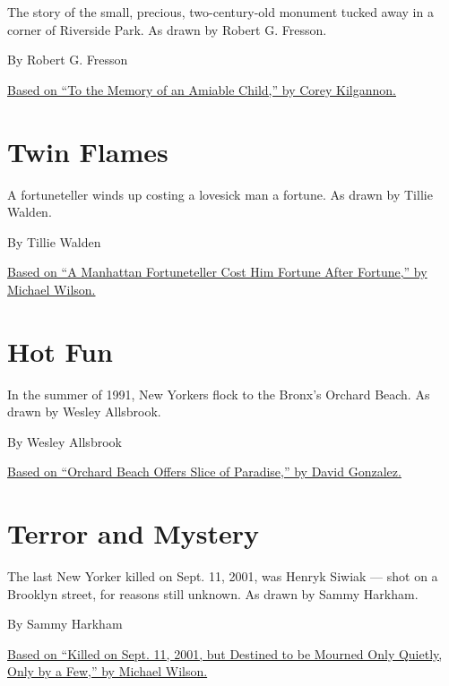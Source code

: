 The story of the small, precious, two-century-old monument tucked away
in a corner of Riverside Park. As drawn by Robert G. Fresson.

By Robert G. Fresson

\href{https://cityroom.blogs.nytimes3xbfgragh.onion/2008/08/12/to-the-memory-of-an-amiable-child/comment-page-1/}{Based
on ``To the Memory of an Amiable Child,'' by Corey Kilgannon.}

\hypertarget{twin-flames}{%
\section{Twin Flames}\label{twin-flames}}

A fortuneteller winds up costing a lovesick man a fortune. As drawn by
Tillie Walden.

By Tillie Walden

\href{https://www.nytimes3xbfgragh.onion/2015/06/06/nyregion/he-went-to-the-fortuneteller-now-his-fortune-is-gone.html}{Based
on ``A Manhattan Fortuneteller Cost Him Fortune After Fortune,'' by
Michael Wilson.}

\hypertarget{hot-fun}{%
\section{Hot Fun}\label{hot-fun}}

In the summer of 1991, New Yorkers flock to the Bronx's Orchard Beach.
As drawn by Wesley Allsbrook.

By Wesley Allsbrook

\href{http://www.nytimes3xbfgragh.onion/1991/07/01/nyregion/orchard-beach-offers-slice-of-paradise.html}{Based
on ``Orchard Beach Offers Slice of Paradise,'' by David Gonzalez.}

\hypertarget{terror-and-mystery}{%
\section{Terror and Mystery}\label{terror-and-mystery}}

The last New Yorker killed on Sept. 11, 2001, was Henryk Siwiak --- shot
on a Brooklyn street, for reasons still unknown. As drawn by Sammy
Harkham.

By Sammy Harkham

\href{http://www.nytimes3xbfgragh.onion/2011/09/10/nyregion/brooklyn-murder-on-sept-11-2001-remains-unsolved.html}{Based
on ``Killed on Sept. 11, 2001, but Destined to be Mourned Only Quietly,
Only by a Few,'' by Michael Wilson.}

